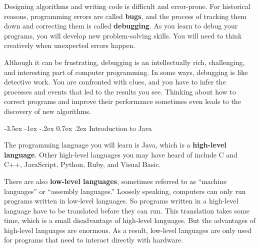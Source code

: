 \documentclass[12pt]{book}
\makeatletter
\theoremstyle{exercise}
\renewcommand{\section}{\@startsection{section}{1}{\z@}%
    {-3.5ex \@plus -1ex \@minus -.2ex}%
    {0.7ex \@plus.2ex}%
    {\normalfont\Large\bfseries}}
\makeatother
\begin{document}

Designing algorithms and writing code is difficult and error-prone.
For historical reasons, programming errors are called {\bf bugs}, and the process of tracking them down and correcting them is called {\bf debugging}.
As you learn to debug your programs, you will develop new problem-solving skills.
You will need to think creatively when unexpected errors happen.




Although it can be frustrating, debugging is an intellectually rich, challenging, and interesting part of computer programming.
In some ways, debugging is like detective work.
You are confronted with clues, and you have to infer the processes and events that led to the results you see.
Thinking about how to correct programs and improve their performance sometimes even leads to the discovery of new algorithms.


\section{Introduction to Java}


The programming language you will learn is Java, which is a {\bf high-level language}.
Other high-level languages you may have heard of include C and C++, JavaScript, Python, Ruby, and Visual Basic.


There are also {\bf low-level languages}, sometimes referred to as ``machine languages'' or ``assembly languages.''
Loosely speaking, computers can only run programs written in low-level languages.
So programs written in a high-level language have to be translated before they can run.
This translation takes some time, which is a small disadvantage of high-level languages.
But the advantages of high-level languages are enormous.
As a result, low-level languages are only used for programs that need to interact directly with hardware.
\end{document}
